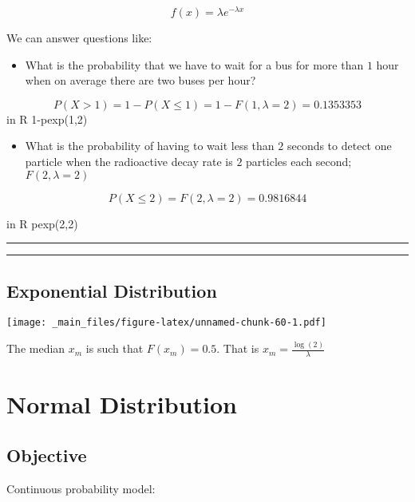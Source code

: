 \documentclass[
]{book}
\providecommand{\tightlist}{%
  \setlength{\itemsep}{0pt}\setlength{\parskip}{0pt}}
\begin{document}
\[f(x)=\lambda e^{-\lambda x}\]

We can answer questions like:

\begin{itemize}
\tightlist
\item
  What is the probability that we have to wait for a bus for more than \(1\) hour when on average there are two buses per hour?
\end{itemize}

\[P(X > 1)=1-P(X \le 1) = 1-F(1,\lambda=2)=0.1353353\]
in R 1-pexp(1,2)

\begin{itemize}
\tightlist
\item
  What is the probability of having to wait less than \(2\) seconds to detect one particle when the radioactive decay rate is \(2\) particles each second; \(F(2,\lambda=2)\)
\end{itemize}

\[P(X \le 2)=F(2,\lambda=2)=0.9816844\]

in R pexp(2,2)

\begin{center}\rule{0.5\linewidth}{0.5pt}\end{center}

\begin{center}\rule{0.5\linewidth}{0.5pt}\end{center}

\hypertarget{exponential-distribution-2}{%
\section{Exponential Distribution}\label{exponential-distribution-2}}

\texttt{[image: \_main\_files/figure-latex/unnamed-chunk-60-1.pdf]}

The median \(x_m\) is such that \(F(x_m)=0.5\). That is \(x_m=\frac{\log(2)}{\lambda}\)

\hypertarget{normal-distribution}{%
\chapter{Normal Distribution}\label{normal-distribution}}

\hypertarget{objective-7}{%
\section{Objective}\label{objective-7}}

Continuous probability model:
\end{document}
